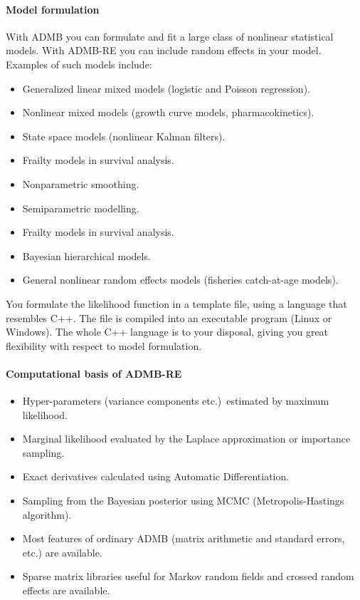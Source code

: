 \documentclass[12pt,letter,reqno]{book}
\begin{document}
\paragraph{Model formulation}

With ADMB you can formulate and fit a large class of nonlinear statistical
models. With ADMB-RE you can include random effects in your model. Examples of such models include:
\begin{itemize}
\item Generalized linear mixed models (logistic and Poisson regression).
\item Nonlinear mixed models (growth curve models, pharmacokinetics).
\item State space models (nonlinear Kalman filters).
\item Frailty models in survival analysis.
\item Nonparametric smoothing.
\item Semiparametric modelling.
\item Frailty models in survival analysis.
\item Bayesian hierarchical models.
\item General nonlinear random effects models (fisheries catch-at-age
models).
\end{itemize}
You formulate the likelihood function in a template file, using a language that resembles C++. The file is
compiled into an executable program (Linux or Windows). The whole C++ language is to your disposal, giving you
great flexibility with respect to model formulation.

\paragraph{Computational basis of ADMB-RE}

\begin{itemize}
\item Hyper-parameters (variance components etc.)~estimated by maximum likelihood.
\item Marginal likelihood evaluated by the Laplace approximation or importance sampling.
\item Exact derivatives calculated using Automatic Differentiation.
\item Sampling from the Bayesian posterior using MCMC (Metropolis-Hastings algorithm).
\item Most features of ordinary ADMB (matrix arithmetic and standard errors, etc.) are available.
\item Sparse matrix libraries useful for Markov random fields and crossed random effects are available.
\end{itemize}
\end{document}
